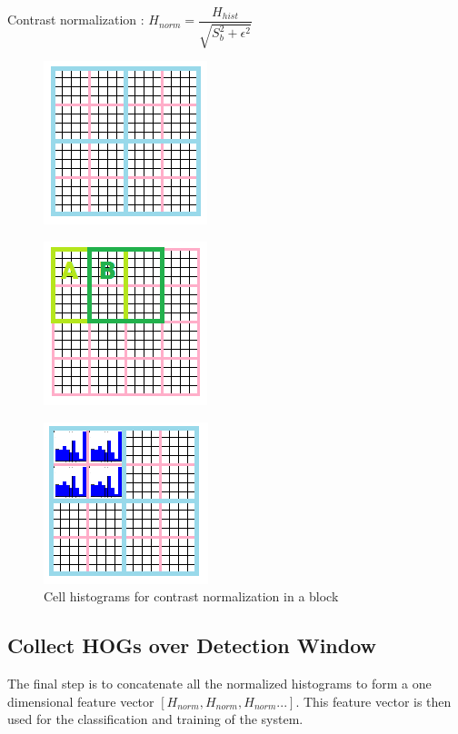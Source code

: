 Contrast normalization : $H_{norm} = \dfrac{H_{hist}}{\sqrt{S_b  ^2 + \epsilon ^2}}$
\begin{figure}[H]
\centering
\begin{minipage}{.5\textwidth}
  \centering
  \includegraphics[width=.5\linewidth]{blocks}
  \label{fig:test1}
\end{minipage}%
\begin{minipage}{.5\textwidth}
  \centering
  \includegraphics[width=.5\linewidth]{overlap}
  \label{fig:test2}
\end{minipage}
\end{figure}

\begin{figure}[H]
  \centering
  \includegraphics[scale=0.8]{norm}
  \caption{Cell histograms for contrast normalization in a block}
\end{figure}

\subsection{Collect HOGs over Detection Window}
The final step is to concatenate all the normalized histograms to form a one dimensional feature vector $[H_{norm}, H_{norm}, H_{norm}...]$. This feature vector is then used for the classification and training of the system.

